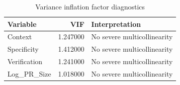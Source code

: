 \begin{table}
\caption{Variance inflation factor diagnostics}
\label{tab:vif}
\begin{tabular}{lrl}
\toprule
Variable & VIF & Interpretation \\
\midrule
Context & 1.247000 & No severe multicollinearity \\
Specificity & 1.412000 & No severe multicollinearity \\
Verification & 1.241000 & No severe multicollinearity \\
Log_PR_Size & 1.018000 & No severe multicollinearity \\
\bottomrule
\end{tabular}
\end{table}
